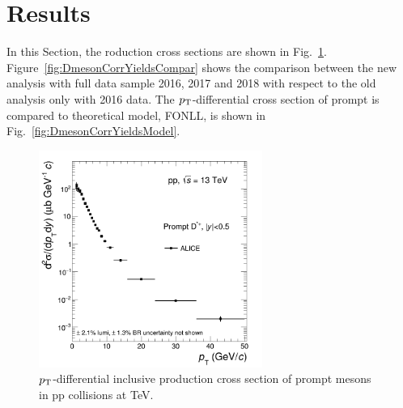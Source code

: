 \section{Results}


In this Section, the \Dstar roduction cross sections are shown in Fig.~\ref{fig:DmesonCorrYields}. Figure~\ref{fig:DmesonCorrYieldsCompar} shows the comparison between the new analysis with full data sample 2016, 2017 and 2018 with respect to the old analysis only with 2016 data. The $p_{\rm T}$-differential cross section of prompt \Dstar is compared to theoretical model, FONLL, is shown in Fig.~\ref{fig:DmesonCorrYieldsModel}.


\begin{figure}[tb]
\begin{center}
\includegraphics[width=0.65\textwidth]{figures/Dstar/pp13TeV/cross-setion-pp13TeV.png}
\caption{$p_{\rm T}$-differential inclusive production cross section of prompt \Dstar mesons in pp collisions at  TeV.} 
\label{fig:DmesonCorrYields}
\end{center}
\end{figure}



